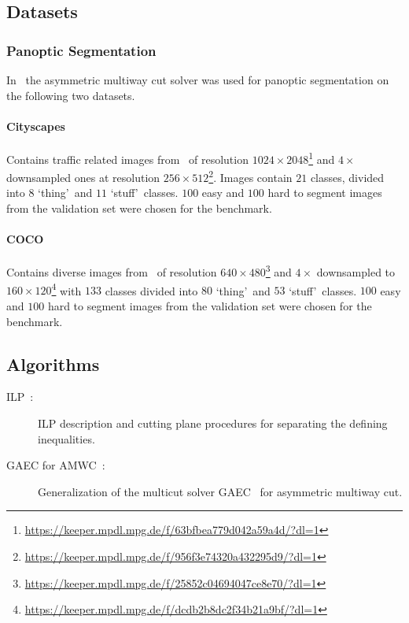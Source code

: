 \subsection{Datasets}

\subsubsection{Panoptic Segmentation}
In~\cite{abbas2021combinatorial} the asymmetric multiway cut solver was used for panoptic segmentation on the following two datasets.

\paragraph{Cityscapes}
Contains traffic related images from~\cite{cordts2016cityscapes} of resolution $1024 \times 2048$\footnote{\url{https://keeper.mpdl.mpg.de/f/63bfbea779d042a59a4d/?dl=1}} and $4 \times$ downsampled ones at resolution $256 \times 512$\footnote{\url{https://keeper.mpdl.mpg.de/f/956f3e74320a432295d9/?dl=1}}.
Images contain $21$ classes, divided into $8$ \lq thing\rq\ and $11$ \lq stuff\rq\ classes.
$100$ easy and $100$ hard to segment images from the validation set were chosen for the benchmark. 

\paragraph{COCO}
Contains diverse images from~\cite{lin2014microsoft} of resolution $640 \times 480$\footnote{\url{https://keeper.mpdl.mpg.de/f/25852c04694047ce8e70/?dl=1}} and $4 \times$ downsampled to $160 \times 120$\footnote{\url{https://keeper.mpdl.mpg.de/f/dcdb2b8dc2f34b21a9bf/?dl=1}} with $133$ classes divided into $80$ \lq thing\rq\ and $53$ \lq stuff\rq\ classes.
$100$ easy and $100$ hard to segment images from the validation set were chosen for the benchmark. 

\subsection{Algorithms}
\begin{description}
\item[ILP~\cite{kroeger2014asymmetric}:] ILP description and cutting plane procedures for separating the defining inequalities.
\item[GAEC for AMWC~\cite{abbas2021combinatorial}:] Generalization of the multicut solver GAEC~\cite{keuper2015efficient} for asymmetric multiway cut.
\end{description}
